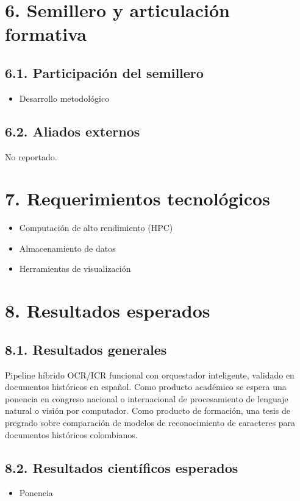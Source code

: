 \documentclass[a4paper,12pt]{article}
\begin{document}
\section*{6. Semillero y articulación formativa}
\subsection*{6.1. Participación del semillero}
\begin{itemize}
    \item Desarrollo metodológico
\end{itemize}

\subsection*{6.2. Aliados externos}
No reportado.

\section*{7. Requerimientos tecnológicos}
\begin{itemize}
    \item Computación de alto rendimiento (HPC)
    \item Almacenamiento de datos
    \item Herramientas de visualización
\end{itemize}

\section*{8. Resultados esperados}
\subsection*{8.1. Resultados generales}
Pipeline híbrido OCR/ICR funcional con orquestador inteligente, validado en documentos históricos en español. Como producto académico se espera una ponencia en congreso nacional o internacional de procesamiento de lenguaje natural o visión por computador. Como producto de formación, una tesis de pregrado sobre comparación de modelos de reconocimiento de caracteres para documentos históricos colombianos.

\subsection*{8.2. Resultados científicos esperados}
\begin{itemize}
    \item Ponencia
\end{itemize}
\end{document}
